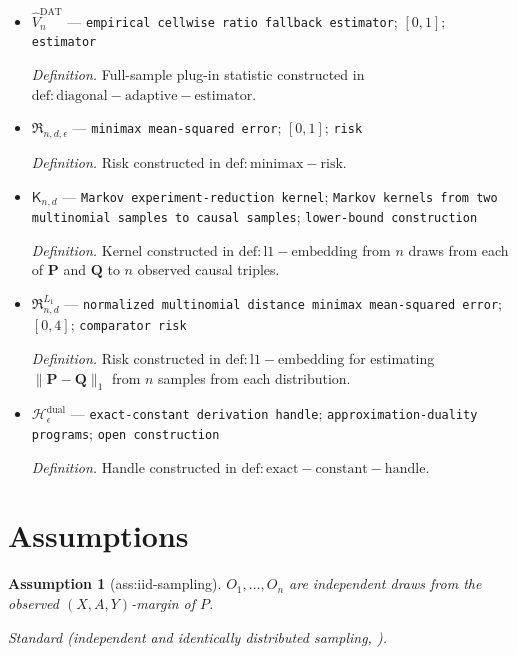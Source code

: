 \documentclass{article}
\newtheorem{assumption}{Assumption}
\begin{document}
\begin{itemize}
  \item \(\widehat V_n^{\mathrm{DAT}}\) --- \texttt{empirical cellwise ratio fallback estimator}; \([0,1]\); \texttt{estimator}
  \par\smallskip\noindent\emph{Definition.} Full-sample plug-in statistic constructed in \(\mathrm{def:diagonal-adaptive-estimator}\).
  \item \(\mathfrak R_{n,d,\epsilon}\) --- \texttt{minimax mean-\allowbreak{}squared error}; \([0,1]\); \texttt{risk}
  \par\smallskip\noindent\emph{Definition.} Risk constructed in \(\mathrm{def:minimax-risk}\).
  \item \(\mathsf K_{n,d}\) --- \texttt{Markov experiment-\allowbreak{}reduction kernel}; \texttt{Markov kernels from two multinomial samples to causal samples}; \texttt{lower-\allowbreak{}bound construction}
  \par\smallskip\noindent\emph{Definition.} Kernel constructed in \(\mathrm{def:l1-embedding}\) from \(n\) draws from each of \(\mathbf P\) and \(\mathbf Q\) to \(n\) observed causal triples.
  \item \(\mathfrak R^{L_1}_{n,d}\) --- \texttt{normalized multinomial distance minimax mean-\allowbreak{}squared error}; \([0,4]\); \texttt{comparator risk}
  \par\smallskip\noindent\emph{Definition.} Risk constructed in \(\mathrm{def:l1-embedding}\) for estimating \(\lVert\mathbf P-\mathbf Q\rVert_1\) from \(n\) samples from each distribution.
  \item \(\mathscr H_\epsilon^{\mathrm{dual}}\) --- \texttt{exact-\allowbreak{}constant derivation handle}; \texttt{approximation-\allowbreak{}duality programs}; \texttt{open construction}
  \par\smallskip\noindent\emph{Definition.} Handle constructed in \(\mathrm{def:exact-constant-handle}\).
\end{itemize}

\section{Assumptions}

\begin{assumption}[ass:iid-sampling]\label{ass:iid-sampling}
\(O_1,\ldots,O_n\) are independent draws from the observed \((X,A,Y)\)-margin of \(P\).
\par\smallskip\noindent\emph{Standard} (independent and identically distributed sampling, \cite{ZengBalakrishnanHanKennedy2024Discrete}).
\end{assumption}
\end{document}
